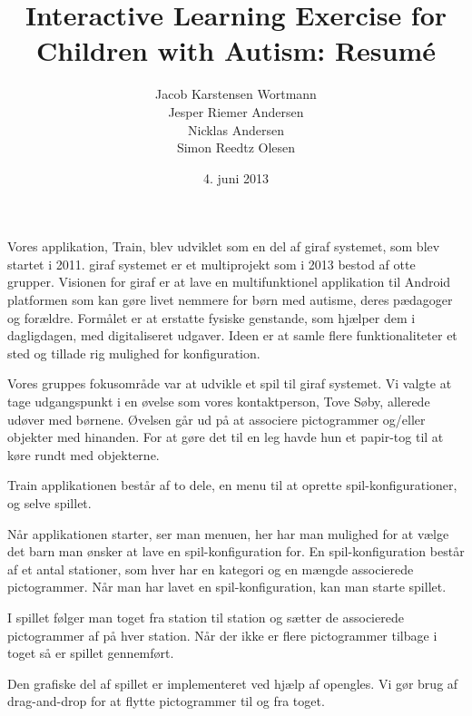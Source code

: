 \documentclass[10pt]{article}
\title{Interactive Learning Exercise for Children with Autism: Resumé}
\author{Jacob Karstensen Wortmann\\Jesper Riemer Andersen\\Nicklas Andersen\\Simon Reedtz Olesen}
\date{4. juni 2013}
\begin{document}
\maketitle

Vores applikation, Train, blev udviklet som en del af \ac{giraf} systemet, som blev startet i 2011. \ac{giraf} systemet er et multiprojekt som i 2013 bestod af otte grupper. Visionen for \ac{giraf} er at lave en multifunktionel applikation til Android platformen som kan gøre livet nemmere for børn med autisme, deres pædagoger og forældre. Formålet er at erstatte fysiske genstande, som hjælper dem i dagligdagen, med digitaliseret udgaver. Ideen er at samle flere funktionaliteter et sted og tillade rig mulighed for konfiguration.

Vores gruppes fokusområde var at udvikle et spil til \ac{giraf} systemet. Vi valgte at tage udgangspunkt i en øvelse som vores kontaktperson, Tove Søby, allerede udøver med børnene. Øvelsen går ud på at associere pictogrammer og/eller objekter med hinanden. For at gøre det til en leg havde hun et papir-tog til at køre rundt med objekterne.

Train applikationen består af to dele, en menu til at oprette spil-konfigurationer, og selve spillet. 

Når applikationen starter, ser man menuen, her har man mulighed for at vælge det barn man ønsker at lave en spil-konfiguration for. En spil-konfiguration består af et antal stationer, som hver har en kategori og en mængde associerede pictogrammer. Når man har lavet en spil-konfiguration, kan man starte spillet.

I spillet følger man toget fra station til station og sætter de associerede pictogrammer af på hver station. Når der ikke er flere pictogrammer tilbage i toget så er spillet gennemført.

Den grafiske del af spillet er implementeret ved hjælp af \acl{opengles}. Vi gør brug af drag-and-drop for at flytte pictogrammer til og fra toget.
\end{document}
